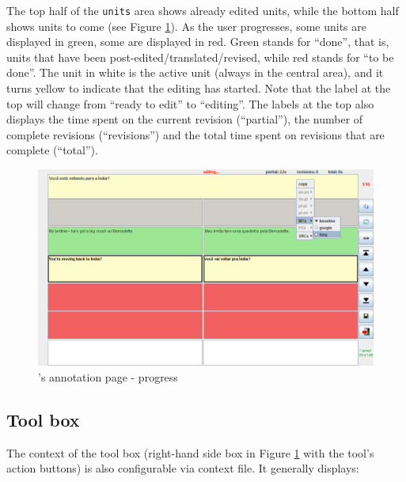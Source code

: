 The top half of the {\tt units} area shows already edited units, while the bottom half shows units to come (see Figure \ref{fig:progress}).
As the user progresses, some units are displayed in green, some are displayed in red. Green stands for ``done'', that is, units that have been post-edited/translated/revised, while red stands for ``to be done''.
The unit in white is the active unit (always in the central area), and it turns yellow to indicate that the editing has started. Note that the label at the top will change from ``ready to edit'' to ``editing''.
The labels at the top also displays the time spent on the current revision (``partial''), the number of complete revisions (``revisions'') and the total time spent on revisions that are complete (``total'').

\begin{figure}[h]\label{fig:progress}
\includegraphics[width=1\textwidth]{img/annotation-progress}
\caption{\PET's annotation page - progress}
\end{figure}

\subsection{Tool box}\label{sec:toolbox}

The context of the tool box (right-hand side box in Figure \ref{fig:progress} with the tool's action buttons) is also configurable via context file. 
It generally displays:

